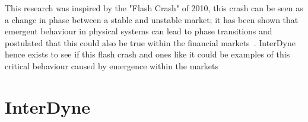 \documentclass{article}
\begin{document}



This research was inspired by the "Flash Crash" of 2010, this crash can be seen as a change in phase between a stable and unstable market; it has been shown that emergent behaviour in physical systems can lead to phase transitions and postulated that this could also be true within the financial markets~\cite{networkcastphorynature}. InterDyne hence exists to see if this flash crash and ones like it could be examples of this critical behaviour caused by emergence within the markets


%


\section{InterDyne} 
\end{document}
